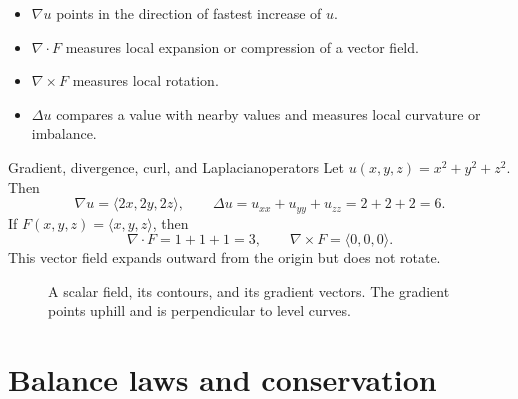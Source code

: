 \documentclass[11pt]{article}
\newcommand{\grad}{\nabla}
\newcommand{\Div}{\nabla\!\cdot}
\newcommand{\Curl}{\nabla\!\times}
\newcommand{\Lap}{\Delta}
\begin{document}
\begin{tipbox}
\begin{itemize}
  \item $\grad u$ points in the direction of fastest increase of $u$.
  \item $\Div F$ measures local expansion or compression of a vector field.
  \item $\Curl F$ measures local rotation.
  \item $\Lap u$ compares a value with nearby values and measures local curvature or imbalance.
\end{itemize}
\end{tipbox}

\begin{examplebox}{Gradient, divergence, curl, and Laplacian}{operators}
Let $u(x,y,z)=x^2+y^2+z^2$. Then
\[
\grad u=\langle 2x,2y,2z\rangle,
\qquad
\Lap u=u_{xx}+u_{yy}+u_{zz}=2+2+2=6.
\]
If $F(x,y,z)=\langle x,y,z\rangle$, then
\[
\Div F=1+1+1=3,
\qquad
\Curl F=\langle 0,0,0\rangle.
\]
This vector field expands outward from the origin but does not rotate.
\end{examplebox}

\begin{figure}[H]
\centering
{}
\caption{A scalar field, its contours, and its gradient vectors. The gradient points uphill and is perpendicular to level curves.}
\end{figure}

\section{Balance laws and conservation}
\end{document}
